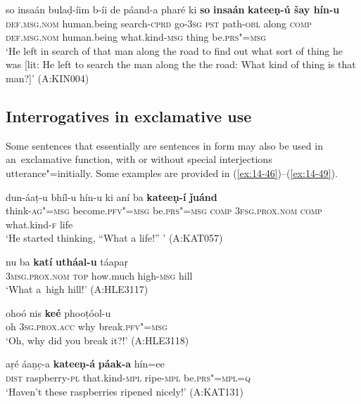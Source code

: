 \begin{exe}
\ex
\label{ex:14-45}
\gll so insaán bulaḍ-íim b-íi de páand-a pharé ki \textbf{so} \textbf{insaán} \textbf{ kateeṇ-ú šay hín-u} \\
\textsc{def.msg.nom} human.being search-\textsc{cprd} go-\textsc{3sg} \textsc{pst} path-\textsc{obl} along \textsc{comp} \textsc{def.msg.nom} human.being what.kind-\textsc{msg} thing be.\textsc{prs"=msg } \\
\glt `He left in search of that man along the road to find out what sort of thing he was [lit: He left to search the man along the the road: What kind of thing is that man?]' (A:KIN004)
\end{exe}

\subsection{Interrogatives in exclamative use}
\label{subsec:14-2-4}

Some sentences that essentially are  sentences in form may also be used in an~exclamative function, with or without special interjections utterance"=initially. Some examples are provided in (\ref{ex:14-46})--(\ref{ex:14-49}). 

\ea
\label{ex:14-46}
\gll dun-áaṭ-u bhíl-u hín-u ki  aní ba \textbf{kateeṇ-í} \textbf{ǰuánd} \\
think-\textsc{ag"=msg} become.\textsc{pfv"=msg} be.\textsc{prs"=msg} \textsc{comp}  \textsc{3fsg.prox.nom} \textsc{comp} what.kind-\textsc{f} life  \\
\glt `He started thinking, ``What a life!'' ' (A:KAT057)

\ex
\label{ex:14-47}
\gll nu ba \textbf{katí} \textbf{utháal-u} táapaṛ \\
\textsc{3msg.prox.nom} \textsc{top} how.much high-\textsc{msg} hill  \\
\glt `What a~high hill!' (A:HLE3117)

\ex
\label{ex:14-48}
\gll ohoó nis \textbf{keé} phooṭóol-u \\
oh \textsc{3sg.prox.acc} why break.\textsc{pfv"=msg} \\
\glt `Oh, why did you break it?!' (A:HLE3118)

\ex
\label{ex:14-49}
\gll aṛé áaṇc̣-a \textbf{kateeṇ-á} \textbf{páak-a} hín=ee \\
\textsc{dist} raspberry-\textsc{pl} that.kind-\textsc{mpl} ripe-\textsc{mpl} be.\textsc{prs"=mpl=q} \\
\glt `Haven't these raspberries ripened nicely!' (A:KAT131)
\z

